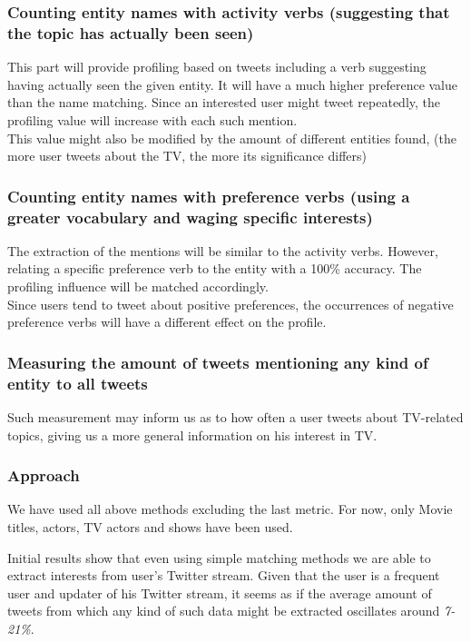\subsubsection{Counting entity names with activity verbs (suggesting that the topic has
    actually been seen)}

This part will provide profiling based on tweets including a verb suggesting
having actually seen the given entity. It will have a much higher preference
value than the name matching. Since an interested user might tweet repeatedly,
the profiling value will increase with each such mention. \\
This value might also be modified by the amount of different entities found,
(the more user tweets about the TV, the more its significance differs)

\subsubsection{Counting entity names with preference verbs (using a greater vocabulary
      and waging specific interests)}

The extraction of the mentions will be similar to the activity verbs. However,
relating a specific preference verb to the entity with a 100\% accuracy. The
profiling influence will be matched accordingly. \\
Since users tend to tweet about positive preferences, the occurrences of negative
preference verbs will have a different effect on the profile.

\subsubsection{Measuring the amount of tweets mentioning any kind of entity to all
  tweets}

Such measurement may inform us as to how often a user tweets about TV-related
topics, giving us a more general information on his interest in TV.

\subsubsection{Approach}
We have used all above methods excluding the last metric. For now, only Movie titles, actors,
TV actors and shows have been used.

Initial results show that even using simple matching methods we are able to extract interests from
user's Twitter stream. Given that the user is a frequent user and updater of his Twitter stream, it seems
as if the average amount of tweets from which any kind of such data might be extracted oscillates around \textit{7-21\%}.

